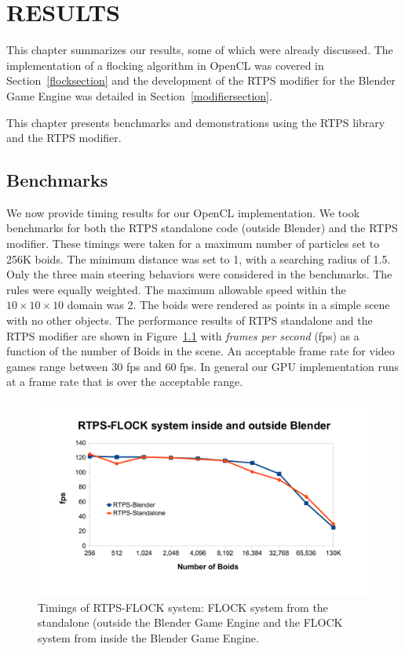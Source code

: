 \chapter{RESULTS}\label{resultsChapter}

This chapter summarizes our results, some of which were already discussed. The implementation of a flocking algorithm in OpenCL was covered in Section~\ref{flocksection} and the development of the RTPS modifier for the Blender Game Engine was detailed in Section~\ref{modifiersection}. 

This chapter presents benchmarks and demonstrations using the RTPS library and the RTPS modifier.

\section{Benchmarks}

We now provide timing results for our OpenCL implementation. We took benchmarks for both the RTPS standalone code (outside Blender) and the RTPS modifier. These timings were taken for a maximum number of particles set to 256K boids. The minimum distance was set to 1, with a searching radius of 1.5. Only the three main steering behaviors were considered in the benchmarks. The rules were equally weighted. The maximum allowable speed within the $10\times 10\times 10$ domain was 2. The boids were rendered as points in a simple scene with no other objects. The performance results of RTPS standalone and the RTPS modifier are shown in Figure~\ref{RTPSvsRTPS} with \textit{frames per second} (fps) as a function of the number of Boids in the scene. An acceptable frame rate for video games range between 30 fps and 60 fps. In general our GPU implementation runs at a frame rate that is over the acceptable range. 

\begin{figure}[htbp]
\begin{center}
\includegraphics[scale=0.7]{figures/RTPSvsRTPS.pdf}
\caption{Timings of RTPS-FLOCK system: FLOCK system from the standalone (outside the Blender Game Engine and the FLOCK system from inside the Blender Game Engine.}
\label{RTPSvsRTPS}
\end{center}
\end{figure}

